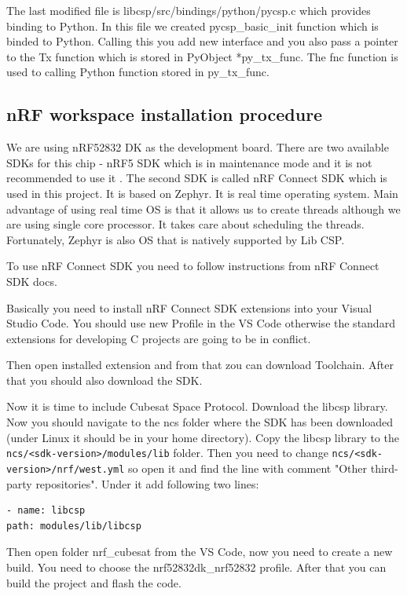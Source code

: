 \documentclass[conference]{IEEEtran}
\begin{document}
The last modified file is libcsp/src/bindings/python/pycsp.c which provides binding to Python. In this file we created pycsp\_basic\_init function which is binded to Python. Calling this you add new interface and you also pass a pointer to the Tx function which is stored in PyObject *py\_tx\_func. The fnc function is used to calling Python function stored in py\_tx\_func.

\subsection{nRF workspace installation procedure}
We are using nRF52832 DK as the development board. There are two available SDKs for this chip - nRF5 SDK which is in maintenance mode and it is not recommended to use it \cite{sdk}. The second SDK is called nRF Connect SDK \cite{connect} which is used in this project. It is based on Zephyr. It is real time operating system. Main advantage of using real time OS is that it allows us to create threads although we are using single core processor. It takes care about scheduling the threads. Fortunately, Zephyr is also OS that is natively supported by Lib CSP.

To use nRF Connect SDK you need to follow instructions from nRF Connect SDK docs.

Basically you need to install nRF Connect SDK extensions into your Visual Studio Code. You should use new Profile in the VS Code otherwise the standard extensions for developing C projects are going to be in conflict.

Then open installed extension and from that zou can download Toolchain. After that you should also download the SDK.

Now it is time to include Cubesat Space Protocol. Download the libcsp library. Now you should navigate to the ncs folder where the SDK has been downloaded (under Linux it should be in your home directory). Copy the libcsp library to the \lstinline{ncs/<sdk-version>/modules/lib} folder. Then you need to change \lstinline{ncs/<sdk-version>/nrf/west.yml} so open it and find the line with comment "Other third-party repositories". Under it add following two lines:
\begin{verbatim}
- name: libcsp
path: modules/lib/libcsp
\end{verbatim}

Then open folder nrf\_cubesat from the VS Code, now you need to create a new build. You need to choose the nrf52832dk\_nrf52832 profile. After that you can build the project and flash the code.
\end{document}
